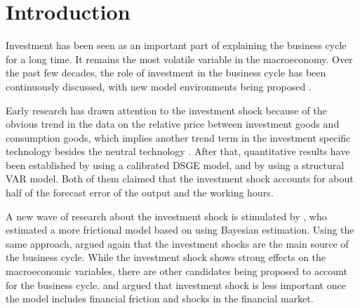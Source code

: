 \section{Introduction}
\label{sec:introduction}
Investment has been seen as an important part of explaining the business cycle for a long time. It remains the most volatile variable in the macroeconomy. Over the past few decades, the role of investment in the business cycle has been continuously discussed, with new model environments being proposed \citep{greenwoodInvestmentCapacityUtilization1988,greenwoodLongRunImplicationsInvestmentSpecific1997a,fisherDynamicEffectsNeutral2006,justinianoInvestmentShocksBusiness2010,winberryLumpyInvestmentBusiness2021}.

Early research has drawn attention to the investment shock because of the obvious trend in the data on the relative price between investment goods and consumption goods, which implies another trend term in the investment specific technology besides the neutral technology \citep{greenwoodInvestmentCapacityUtilization1988}. After that, quantitative results have been established by \cite{greenwoodLongRunImplicationsInvestmentSpecific1997a} using a calibrated DSGE model, and by \cite{fisherDynamicEffectsNeutral2006} using a structural VAR model. Both of them claimed that the investment shock accounts for about half of the forecast error of the output and the working hours.

A new wave of research about the investment shock is stimulated by \cite{smetsShocksFrictionsUS2007}, who estimated a more frictional model based on \cite{christianoNominalRigiditiesDynamic2005} using Bayesian estimation. Using the same approach, \cite{justinianoInvestmentShocksBusiness2010, justinianoInvestmentShocksRelative2011} argued again that the investment shocks are the main source of the business cycle. While the investment shock shows strong effects on the macroeconomic variables, there are other candidates being proposed to account for the business cycle. \cite{christianoRiskShocks2014} and \cite{kamberFinancialFrictionsRole2015} argued that investment shock is less important once the model includes financial friction and shocks in the financial market.

